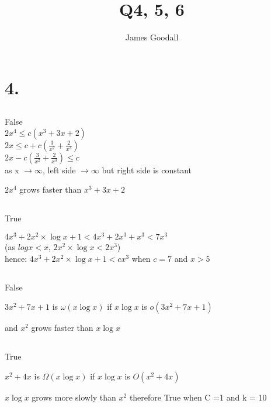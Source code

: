 \documentclass{article}
\author{James Goodall}
\title{Q4, 5, 6}
\begin{document}
\maketitle

\section{4.}
    \subsection{}

False
\\
\(2x^4 \le c(x^3+3x+2)\) \\
\(2x \le c+c(\frac{3}{x^2}+\frac{2}{x^3})\) \\
\(2x- c(\frac{3}{x^2}+\frac{2}{x^3}) \le c\) \\
as x \(\to \infty\), left side \(\to \infty\) but right side is constant

\(2x^4\) grows faster than \(x^3+3x+2\)

    \subsection{}

True

\(4x^3+2x^2 \times \log{x} + 1 < 4x^3+2x^3+x^3 < 7x^3\) \\
(as \(log{x} < x\), \(2x^2 \times \log{x} < 2x^3\)) \\
hence:
\(4x^3+2x^2 \times \log{x} + 1 < cx^3\) when \(c = 7\) and \(x >  5\)

    \subsection{}
False

\(3x^2 + 7x + 1\) is \(\omega(x\log{x})\) if \(x\log{x}\) is \(o(3x^2 + 7x + 1)\)

and \(x^2\) grows faster than \(x\log{x}\)

    \subsection{}

True

\(x^2 +4x\) is \(\Omega(x\log{x})\) if \(x\log{x}\) is \(O(x^2+4x)\)

\(x\log{x}\) grows more slowly than \(x^2\) therefore True when C =1 and k = 10

    \subsection{}
\end{document}
